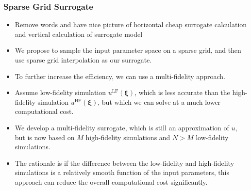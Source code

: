 \documentclass[11pt,ucs]{beamer}
\begin{document}
\begin{frame}\frametitle{Sparse Grid Surrogate}

\begin{itemize}
\item \alert{Remove words and have nice picture of horizontal cheap  surrogate calculation and vertical calculation of surrogate model}

\item We propose to sample the input parameter space on a sparse grid, and then use sparse grid interpolation as our surrogate. 

\item To further increase the efficiency, we can use a multi-fidelity approach. 

\item Assume low-fidelity simulation $u^\text{LF}(\boldsymbol{\xi})$, which is less accurate than the high-fidelity simulation $u^\text{HF}(\boldsymbol{\xi})$, but which we can solve at a much lower computational cost. 

\item We  develop a multi-fidelity surrogate, which is still an approximation of $u$, but is now based on $M$ high-fidelity simulations and $N>M$ low-fidelity simulations. 

\item The rationale is if the difference between the low-fidelity and high-fidelity simulations is a relatively smooth function of the input parameters, this approach can reduce the overall computational cost significantly.

\end{itemize}

\end{frame}
\end{document}
